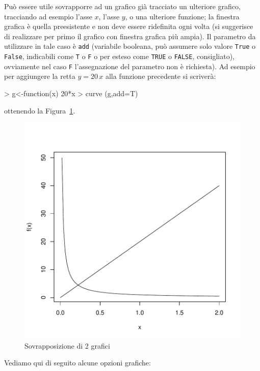 \documentclass[onecolumn,11pt]{book}
\begin{document}
Pu\`o essere utile sovrapporre ad un grafico gi\`a tracciato un ulteriore grafico, tracciando ad esempio l'asse $x$, l'asse $y$, o una ulteriore funzione;  la finestra grafica \`e quella preesistente e non deve essere ridefinita ogni volta (si suggerisce di realizzare per primo il grafico con finestra grafica pi\`u ampia). Il parametro da utilizzare in tale caso \`e \texttt{add} (variabile booleana, pu\`o assumere solo valore \texttt{True} o \texttt{False}, indicabili come \texttt{T}  o \texttt{F} o per esteso come \texttt{TRUE}  o \texttt{FALSE}, consigliato), ovviamente nel caso \texttt{F} l'assegnazione del parametro non \`e richiesta). Ad esempio per aggiungere la retta $y=20\,x$ alla funzione precedente si scriver\`a:%
\begin{Schunk}
\begin{Sinput}
> g<-function(x) 20*x
> curve (g,add=T) 
\end{Sinput}
\end{Schunk}
ottenendo la Figura~\ref{addF}.
\begin{figure}[htbp]
\begin{center}
\includegraphics{statisticaconR-057}
\caption{Sovrapposizione di 2 grafici}
\label{addF}
\end{center}
\end{figure}
Vediamo qui di seguito alcune opzioni grafiche:
\end{document}
